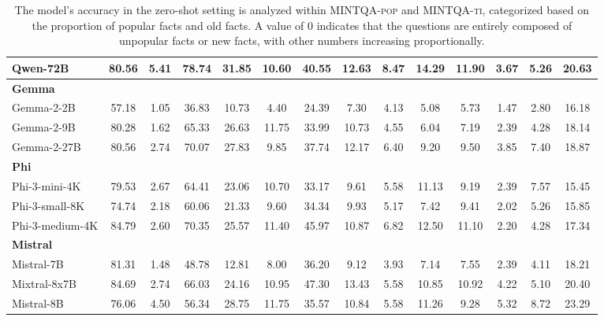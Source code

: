 \begin{table}[!tbp]
\begin{tabular}{l|cccccc|ccccccc}
        Qwen-72B & 80.56 & 5.41 & 78.74 & 31.85 & 10.60 & 40.55 & 12.63 & 8.47 & 14.29 & 11.90 & 3.67 & 5.26 & 20.63 \\
        \hline
        \multicolumn{14}{l}{\textbf{Gemma}} \\
        \hline
        Gemma-2-2B & 57.18 & 1.05 & 36.83 & 10.73 & 4.40 & 24.39 & 7.30 & 4.13 & 5.08 & 5.73 & 1.47 & 2.80 & 16.18 \\
        Gemma-2-9B & 80.28 & 1.62 & 65.33 & 26.63 & 11.75 & 33.99 & 10.73 & 4.55 & 6.04 & 7.19 & 2.39 & 4.28 & 18.14 \\
        Gemma-2-27B & 80.56 & 2.74 & 70.07 & 27.83 & 9.85 & 37.74 & 12.17 & 6.40 & 9.20 & 9.50 & 3.85 & 7.40 & 18.87 \\
        \hline
        \multicolumn{14}{l}{\textbf{Phi}} \\
        \hline
        Phi-3-mini-4K & 79.53 & 2.67 & 64.41 & 23.06 & 10.70 & 33.17 & 9.61 & 5.58 & 11.13 & 9.19 & 2.39 & 7.57 & 15.45 \\
        Phi-3-small-8K & 74.74 & 2.18 & 60.06 & 21.33 & 9.60 & 34.34 & 9.93 & 5.17 & 7.42 & 9.41 & 2.02 & 5.26 & 15.85 \\
        Phi-3-medium-4K & 84.79 & 2.60 & 70.35 & 25.57 & 11.40 & 45.97 & 10.87 & 6.82 & 12.50 & 11.10 & 2.20 & 4.28 & 17.34 \\
        \hline
        \multicolumn{14}{l}{\textbf{Mistral}} \\
        \hline
        Mistral-7B & 81.31 & 1.48 & 48.78 & 12.81 & 8.00 & 36.20 & 9.12 & 3.93 & 7.14 & 7.55 & 2.39 & 4.11 & 18.21 \\
        Mixtral-8x7B & 84.69 & 2.74 & 66.03 & 24.16 & 10.95 & 47.30 & 13.43 & 5.58 & 10.85 & 10.92 & 4.22 & 5.10 & 20.40 \\
        Mistral-8B & 76.06 & 4.50 & 56.34 & 28.75 & 11.75 & 35.57 & 10.84 & 5.58 & 11.26 & 9.28 & 5.32 & 8.72 & 23.29 \\
        \hline
    \end{tabular}
        \caption{The model's accuracy in the zero-shot setting is analyzed within \textsc{MINTQA-pop} and \textsc{MINTQA-ti}, categorized based on the proportion of popular facts and old facts. A value of 0 indicates that the questions are entirely composed of unpopular facts or new facts, with other numbers increasing proportionally.}
    \label{tab:app_zero}
\end{table}
